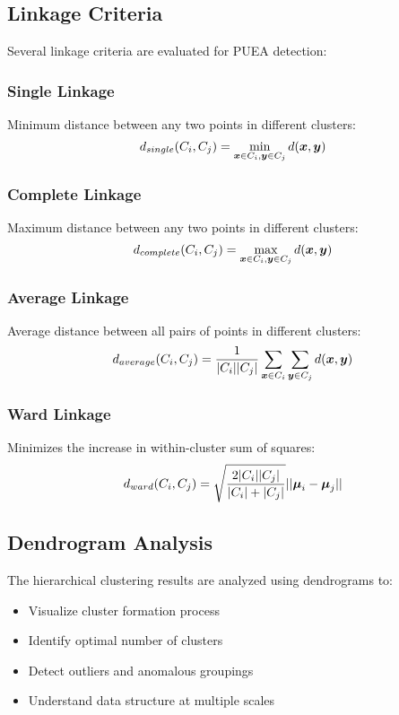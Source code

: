 \subsection{Linkage Criteria}
Several linkage criteria are evaluated for PUEA detection:

\subsubsection{Single Linkage}
Minimum distance between any two points in different clusters:
\begin{equation}
d_{single}(C_i, C_j) = \min_{\boldsymbol{x} \in C_i, \boldsymbol{y} \in C_j} d(\boldsymbol{x}, \boldsymbol{y})
\end{equation}

\subsubsection{Complete Linkage}
Maximum distance between any two points in different clusters:
\begin{equation}
d_{complete}(C_i, C_j) = \max_{\boldsymbol{x} \in C_i, \boldsymbol{y} \in C_j} d(\boldsymbol{x}, \boldsymbol{y})
\end{equation}

\subsubsection{Average Linkage}
Average distance between all pairs of points in different clusters:
\begin{equation}
d_{average}(C_i, C_j) = \frac{1}{|C_i||C_j|} \sum_{\boldsymbol{x} \in C_i} \sum_{\boldsymbol{y} \in C_j} d(\boldsymbol{x}, \boldsymbol{y})
\end{equation}

\subsubsection{Ward Linkage}
Minimizes the increase in within-cluster sum of squares:
\begin{equation}
d_{ward}(C_i, C_j) = \sqrt{\frac{2|C_i||C_j|}{|C_i|+|C_j|}} ||\boldsymbol{\mu}_i - \boldsymbol{\mu}_j||
\end{equation}

\subsection{Dendrogram Analysis}
The hierarchical clustering results are analyzed using dendrograms to:
\begin{itemize}
\item Visualize cluster formation process
\item Identify optimal number of clusters
\item Detect outliers and anomalous groupings
\item Understand data structure at multiple scales
\end{itemize}

